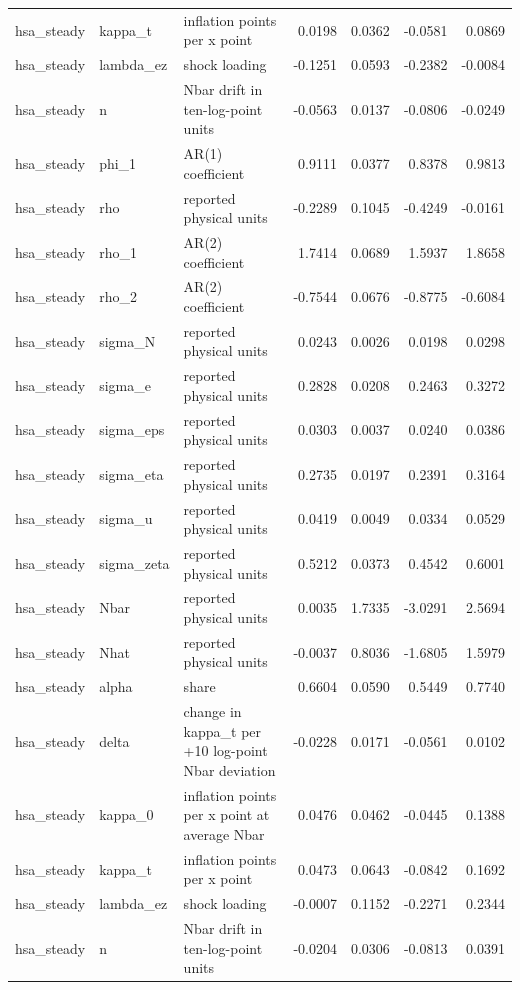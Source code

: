 \begin{tabular}{lllrrrr}
hsa\_steady & kappa\_t & inflation points per x point & 0.0198 & 0.0362 & -0.0581 & 0.0869 \\
hsa\_steady & lambda\_ez & shock loading & -0.1251 & 0.0593 & -0.2382 & -0.0084 \\
hsa\_steady & n & Nbar drift in ten-log-point units & -0.0563 & 0.0137 & -0.0806 & -0.0249 \\
hsa\_steady & phi\_1 & AR(1) coefficient & 0.9111 & 0.0377 & 0.8378 & 0.9813 \\
hsa\_steady & rho & reported physical units & -0.2289 & 0.1045 & -0.4249 & -0.0161 \\
hsa\_steady & rho\_1 & AR(2) coefficient & 1.7414 & 0.0689 & 1.5937 & 1.8658 \\
hsa\_steady & rho\_2 & AR(2) coefficient & -0.7544 & 0.0676 & -0.8775 & -0.6084 \\
hsa\_steady & sigma\_N & reported physical units & 0.0243 & 0.0026 & 0.0198 & 0.0298 \\
hsa\_steady & sigma\_e & reported physical units & 0.2828 & 0.0208 & 0.2463 & 0.3272 \\
hsa\_steady & sigma\_eps & reported physical units & 0.0303 & 0.0037 & 0.0240 & 0.0386 \\
hsa\_steady & sigma\_eta & reported physical units & 0.2735 & 0.0197 & 0.2391 & 0.3164 \\
hsa\_steady & sigma\_u & reported physical units & 0.0419 & 0.0049 & 0.0334 & 0.0529 \\
hsa\_steady & sigma\_zeta & reported physical units & 0.5212 & 0.0373 & 0.4542 & 0.6001 \\
hsa\_steady & Nbar & reported physical units & 0.0035 & 1.7335 & -3.0291 & 2.5694 \\
hsa\_steady & Nhat & reported physical units & -0.0037 & 0.8036 & -1.6805 & 1.5979 \\
hsa\_steady & alpha & share & 0.6604 & 0.0590 & 0.5449 & 0.7740 \\
hsa\_steady & delta & change in kappa\_t per +10 log-point Nbar deviation & -0.0228 & 0.0171 & -0.0561 & 0.0102 \\
hsa\_steady & kappa\_0 & inflation points per x point at average Nbar & 0.0476 & 0.0462 & -0.0445 & 0.1388 \\
hsa\_steady & kappa\_t & inflation points per x point & 0.0473 & 0.0643 & -0.0842 & 0.1692 \\
hsa\_steady & lambda\_ez & shock loading & -0.0007 & 0.1152 & -0.2271 & 0.2344 \\
hsa\_steady & n & Nbar drift in ten-log-point units & -0.0204 & 0.0306 & -0.0813 & 0.0391 \\

\end{tabular}
